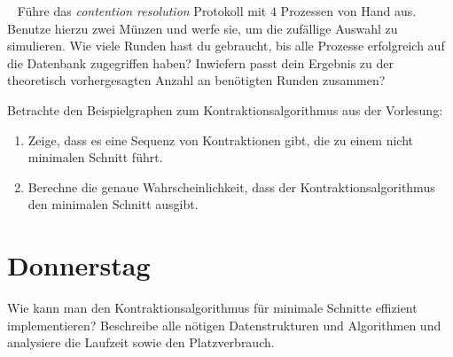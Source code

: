 \documentclass{uebung_cs}
\begin{document}
\begin{aufgabe}\
	Führe das \textit{contention resolution} Protokoll mit $4$ Prozessen von Hand aus. Benutze hierzu zwei Münzen und werfe sie, um die zufällige Auswahl zu simulieren.
	Wie viele Runden hast du gebraucht, bis alle Prozesse erfolgreich auf die Datenbank zugegriffen haben?
	Inwiefern passt dein Ergebnis zu der theoretisch vorhergesagten Anzahl an benötigten Runden zusammen?
\end{aufgabe}    

\begin{aufgabe}[Minimaler Schnitt]
	Betrachte den Beispielgraphen zum Kontraktionsalgorithmus aus der Vorlesung:
	\begin{center}
	\end{center}
	\begin{enumerate}
		\item Zeige, dass es eine Sequenz von Kontraktionen gibt, die zu einem nicht minimalen Schnitt führt.
		\item Berechne die genaue Wahrscheinlichkeit, dass der Kontraktionsalgorithmus den minimalen Schnitt ausgibt.
	\end{enumerate}
\end{aufgabe}

\section*{Donnerstag}

\begin{aufgabe}
	Wie kann man den Kontraktionsalgorithmus für minimale Schnitte effizient implementieren? Beschreibe alle nötigen Datenstrukturen und Algorithmen und analysiere die Laufzeit sowie den Platzverbrauch.
\end{aufgabe}
\end{document}
